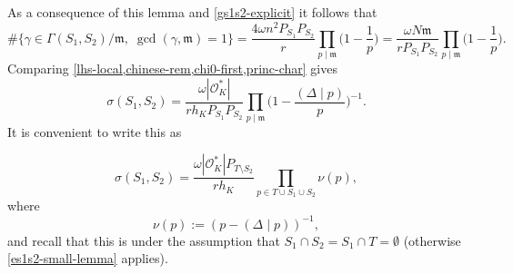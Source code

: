 \documentclass[11pt,reqno]{amsart}
\numberwithin{equation}{section}
\theoremstyle{definition}
\theoremstyle{remark}
\newcommand{\mf}{\mathfrak}
\newcommand{\legendre}[2]{(#1 \mid #2)}
\renewcommand\O{\mathcal{O}}
\begin{document}
As a consequence of this lemma and \cref{gs1s2-explicit} it follows that 
\begin{equation}\label{lhs-local} \# \{ \gamma \in \Gamma(S_1, S_2) /\mf{m} , \;\gcd(\gamma, \mf{m}) = 1 \}
 = \frac{4 \omega n^2 P_{S_1} P_{S_2} }{ r} \prod_{p \mid \mf{m}} \Big(1 - \frac{1}{p}\Big) = \frac{ \omega N\mf{m}}{ rP_{S_1} P_{S_2}} \prod_{p \mid \mf{m}} \Big(1 - \frac{1}{p}\Big).\end{equation}
 Comparing \cref{lhs-local,chinese-rem,chi0-first,princ-char} gives
 \begin{equation}\label{sig-first} \sigma(S_1, S_2) = \frac{\omega |\O^*_K|}{ r h_K P_{S_1} P_{S_2}} \prod_{p \mid \mf{m}} \bigg( 1 - \frac{\legendre{\Delta}{p}}{p}\bigg)^{-1}.\end{equation}
 It is convenient to write this as 


\begin{equation}\label{sigma-s1-s2} \sigma(S_1, S_2) = \frac{ \omega |\O^*_K| P_{T \setminus S_2} }{ rh_K} \prod_{p \in T \cup S_1 \cup S_2}\nu(p),\end{equation}
where 
\begin{equation}\label{nu-def} \nu(p) := (p - \legendre{\Delta}{p})^{-1},
\end{equation}
and recall that this is under the assumption that $S_1 \cap S_2 = S_1 \cap T = \emptyset$ (otherwise \cref{es1s2-small-lemma} applies).
 
\end{document}
